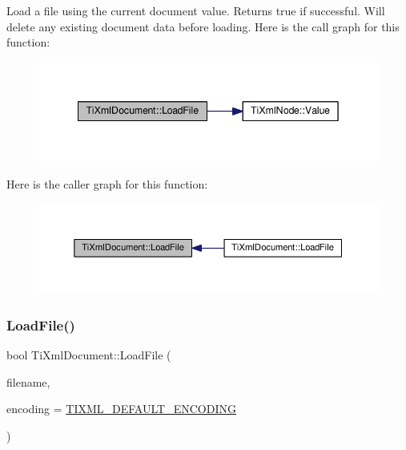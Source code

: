 Load a file using the current document value. Returns true if successful. Will delete any existing document data before loading. Here is the call graph for this function\+:
\nopagebreak
\begin{figure}[H]
\begin{center}
\leavevmode
\includegraphics[width=342pt]{class_ti_xml_document_a4c852a889c02cf251117fd1d9fe1845f_cgraph}
\end{center}
\end{figure}
Here is the caller graph for this function\+:
\nopagebreak
\begin{figure}[H]
\begin{center}
\leavevmode
\includegraphics[width=350pt]{class_ti_xml_document_a4c852a889c02cf251117fd1d9fe1845f_icgraph}
\end{center}
\end{figure}
\mbox{\label{class_ti_xml_document_a879cdf5e981b8b2d2ef82f2546dd28fb}} 
\subsubsection{\texorpdfstring{Load\+File()}{LoadFile()}\hspace{0.1cm}{\footnotesize\ttfamily [2/3]}}
{\footnotesize\ttfamily bool Ti\+Xml\+Document\+::\+Load\+File (\begin{DoxyParamCaption}\item[{const char $\ast$}]{filename,  }\item[{\hyperlink{tinyxml_8h_a88d51847a13ee0f4b4d320d03d2c4d96}{Ti\+Xml\+Encoding}}]{encoding = {\ttfamily \hyperlink{tinyxml_8h_ad5b8b092878e9010d6400cb6c13d4879}{T\+I\+X\+M\+L\+\_\+\+D\+E\+F\+A\+U\+L\+T\+\_\+\+E\+N\+C\+O\+D\+I\+NG}} }\end{DoxyParamCaption})}




